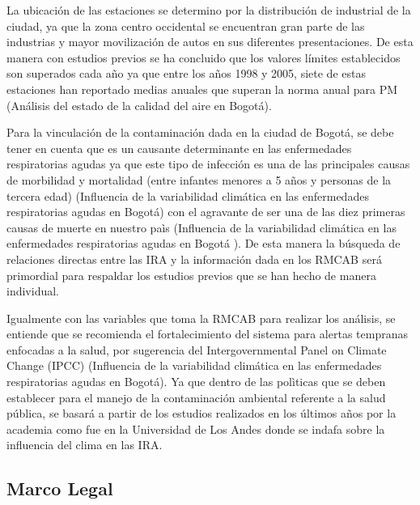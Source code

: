 \documentclass[a4paper, 11pt, oneside]{article}
\theoremstyle{definition}
\theoremstyle{remark}
\begin{document}
La ubicación de las estaciones se determino por la distribución de industrial de la ciudad, ya que la zona centro occidental se encuentran gran parte de las industrias y mayor movilización de autos en sus diferentes presentaciones. De esta manera con estudios previos se ha concluido que los valores límites establecidos son superados cada año ya que entre los años 1998 y 2005, siete de estas estaciones han reportado medias anuales que superan la norma anual para PM (Análisis del estado de la calidad del aire en Bogotá).

Para la vinculación de la contaminación dada en la ciudad de Bogotá, se debe tener en cuenta que es un causante determinante en las enfermedades respiratorias agudas ya que este tipo de infección es una de las principales causas de morbilidad y mortalidad (entre infantes menores a 5 años y personas de la tercera edad) (Influencia de la variabilidad climática en las enfermedades respiratorias agudas en Bogotá) con el agravante de ser una de las diez primeras causas de muerte en nuestro paìs (Influencia de la variabilidad climática en las enfermedades respiratorias agudas en Bogotá 
). De esta manera la búsqueda de relaciones directas entre las IRA y la información dada en los RMCAB será primordial para respaldar los estudios previos que se han hecho de manera individual. 

Igualmente con las variables que toma la RMCAB para realizar los análisis, se entiende que se recomienda el fortalecimiento del sistema para alertas tempranas enfocadas a la salud, por sugerencia del Intergovernmental Panel on Climate Change (IPCC) (Influencia de la variabilidad climática en las enfermedades respiratorias agudas en Bogotá). Ya que dentro de las polìticas que se deben establecer para el manejo de la contaminación ambiental referente a la salud pública, se basará a partir de los estudios realizados en los últimos años por la academia como fue en la Universidad de Los Andes donde se indafa sobre la influencia del clima en las IRA.



\subsection{Marco Legal}
\end{document}
